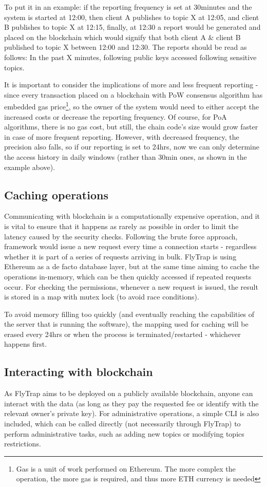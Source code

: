 To put it in an example: if the reporting frequency is set at 30minutes and the system is started at 12:00, then client A publishes to topic  X at 12:05, and client B publishes to topic X at 12:15, finally, at 12:30 a report would be generated and placed on the blockchain which would signify that both client A \& client B published to topic X between 12:00 and 12:30. The reports should be read as follows: In the past X minutes, following public keys accessed following sensitive topics. 

It is important to consider the implications of more and less frequent reporting - since every transaction placed on a blockchain with PoW consensus algorithm has embedded gas price\footnote{Gas is a unit of work performed on Ethereum. The more complex the operation, the more gas is required, and thus more ETH currency is needed}, so the owner of the system would need to either accept the increased costs or decrease the reporting frequency. Of course, for PoA algorithms, there is no gas cost, but still, the chain code's size would grow faster in case of more frequent reporting. However, with decreased frequency, the precision also falls, so if our reporting is set to 24hrs, now we can only determine the access history in daily windows (rather than 30min ones, as shown in the example above).
\subsection{Caching operations}
Communicating with blockchain is a computationally expensive operation, and it is vital to ensure that it happens as rarely as possible in order to limit the latency caused by the security checks. Following the brute force approach, framework would issue a new request every time a connection starts - regardless whether it is part of a series of requests arriving in bulk. FlyTrap is using Ethereum as a de facto database layer, but at the same time aiming to cache the operations in-memory, which can be then quickly accessed if repeated requests occur. For checking the permissions, whenever a new request is issued, the result is stored in a map with mutex lock (to avoid race conditions).

To avoid memory filling too quickly (and eventually reaching the capabilities of the server that is running the software), the mapping used for caching will be erased every 24hrs or when the process is terminated/restarted - whichever happens first.

\subsection{Interacting with blockchain}\label{sec:interact}
As FlyTrap aims to be deployed on a publicly available blockchain, anyone can interact with the data (as long as they pay the requested fee or identify with the relevant owner's private key). For administrative operations, a simple CLI is also included, which can be called directly (not necessarily through FlyTrap) to perform administrative tasks, such as adding new topics or modifying topics restrictions.
